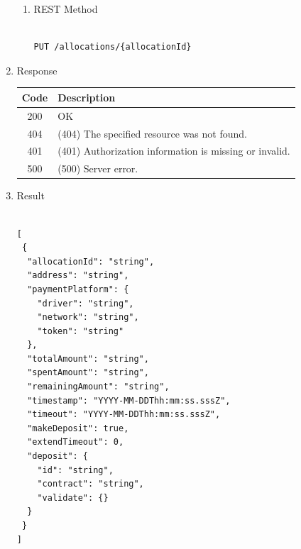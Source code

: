 \begin{enumerate}
\begin{enumerate}
\item REST Method

\begin{tcolorbox}[boxrule=0pt, frame empty]
\begin{verbatim} 

PUT /allocations/{allocationId}

\end{verbatim}
\end{tcolorbox}

\end{enumerate}

\item Response

\begin{table}[H]
\footnotesize

\begin{center}
\begin{tabular}{|c|l|} 
\hline
\rowcolor{lightgray}	Code 		& 	Description \\
\hline
200	 		&	OK \\
\hline
404			&	(404) The specified resource was not found. \\
\hline
401			&	(401) Authorization information is missing or invalid. \\
\hline
500			&	(500) Server error. \\
\hline
\end{tabular}
\end{center}

\end{table}

\item Result

\begin{tcolorbox}[boxrule=0pt, frame empty]
\begin{verbatim}

[
 {
  "allocationId": "string",
  "address": "string",
  "paymentPlatform": {
    "driver": "string",
    "network": "string",
    "token": "string"
  },
  "totalAmount": "string",
  "spentAmount": "string",
  "remainingAmount": "string",
  "timestamp": "YYYY-MM-DDThh:mm:ss.sssZ",
  "timeout": "YYYY-MM-DDThh:mm:ss.sssZ",
  "makeDeposit": true,
  "extendTimeout": 0,
  "deposit": {
    "id": "string",
    "contract": "string",
    "validate": {}
  }
 }
]

\end{verbatim}
\end{tcolorbox}

\begin{table}[H]
\footnotesize


\end{table}
\end{enumerate}
